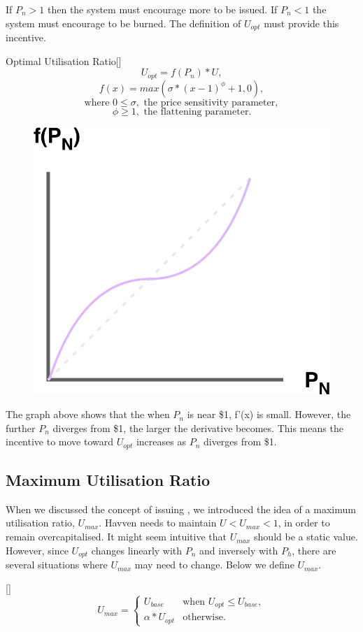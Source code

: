 \noindent If $P_n > 1$ then the system must encourage more \NOM{} to be issued. If $P_n < 1$ the system must encourage \NOM{} to be burned. The definition of $U_{opt}$ must provide this incentive. \\

\begin{namedthm}{Optimal Utilisation Ratio}[]
$$ U_{opt} = f(P_n) * U,$$
$$ f(x) = max(\sigma * (x - 1)^{\phi} + 1, 0), $$
$$\text{where } 0 \leq \sigma, \text{ the price sensitivity parameter}, $$
$$\phi \geq 1, \text{ the flattening parameter}. $$
\end{namedthm}

\begin{figure}[h!]
    \centering
    \includegraphics[width=.5\textwidth]{img/U_opt}
\end{figure}

\noindent The graph above shows that the when $P_n$ is near \$1, f'(x) is small. However, the further $P_n$ diverges from \$1, the larger the derivative becomes. This means the incentive to move toward $U_{opt}$ increases as $P_n$ diverges from \$1.

\newpage

\subsection*{Maximum Utilisation Ratio}

\noindent When we discussed the concept of issuing \NOM{}, we introduced the idea of a maximum utilisation ratio, $U_{max}$. Havven needs to maintain $U < U_{max} < 1$, in order to remain overcapitalised. It might seem intuitive that $U_{max}$ should be a static value. However, since $U_{opt}$ changes linearly with $P_n$ and inversely with $P_h$, there are several situations where $U_{max}$ may need to change. Below we define $U_{max}$.

\begin{namedthm}{}[]
\[
U_{max} = 
\begin{cases}
 U_{base} &\mbox{when } U_{opt} \leq U_{base}, \\ 
 \alpha * U_{opt} &\mbox{otherwise}.
 \end{cases}
\]
\end{namedthm}

